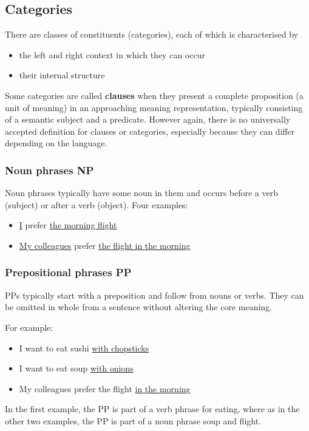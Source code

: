 \documentclass[Report.tex]{subfiles}
\begin{document}
\subsection{Categories}
There are classes of constituents (categories), each of which is characterised by
\begin{itemize}
\item the left and right context in which they can occur
\item their internal structure
\end{itemize}
Some categories are called \textbf{clauses} when they present a complete
proposition (a unit of meaning) in an approaching meaning representation,
typically consisting of a semantic subject and a predicate. However again, there
is no universally accepted definition for clauses or categories, especially
because they can differ depending on the language.

\subsubsection{Noun phrases NP}
Noun phrases typically have some noun in them and occurs before a verb (subject) 
or after a verb (object).
Four examples:
\begin{itemize}
\item \underline{I} prefer \underline{the morning flight}
\item \underline{My colleagues} prefer \underline{the flight in the morning}
\end{itemize}

\subsubsection{Prepositional phrases PP}
PPs typically start with a preposition and follow from nouns or verbs. They
can be omitted in whole from a sentence without altering the core meaning.

For example:
\begin{itemize}
\item I want to eat sushi \underline{with chopsticks}
\item I want to eat soup \underline{with onions}
\item My colleagues prefer the flight \underline{in the morning}
\end{itemize}
In the first example, the PP is part of a verb phrase for eating, where as in the
other two examples, the PP is part of a noun phrase soup and flight.
\end{document}

